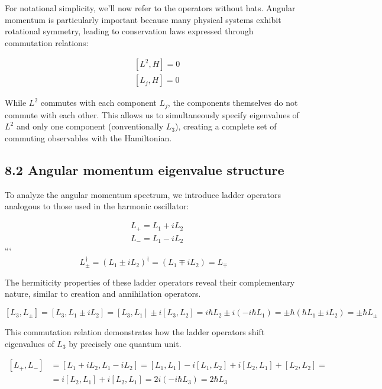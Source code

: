 \documentclass[italian]{HKNdocument}
\begin{document}
For notational simplicity, we'll now refer to the operators without hats. Angular momentum is particularly important because many physical systems exhibit rotational symmetry, leading to conservation laws expressed through commutation relations:

\begin{align*}
& {\left[L^{2}, H\right]=0} \\
& {\left[L_{j}, H\right]=0} \tag{8.7}
\end{align*}

While $L^2$ commutes with each component $L_j$, the components themselves do not commute with each other. This allows us to simultaneously specify eigenvalues of $L^2$ and only one component (conventionally $L_3$), creating a complete set of commuting observables with the Hamiltonian.

\subsection*{8.2 Angular momentum eigenvalue structure}
To analyze the angular momentum spectrum, we introduce ladder operators analogous to those used in the harmonic oscillator:

\begin{align*}
& L_{+}=L_{1}+i L_{2} \\
& L_{-}=L_{1}-i L_{2} \tag{8.8}
\end{align*}
```
\begin{equation*}
L_{ \pm}^{\dagger}=\left(L_{1} \pm i L_{2}\right)^{\dagger}=\left(L_{1} \mp i L_{2}\right)=L_{\mp} \tag{8.9}
\end{equation*}

The hermiticity properties of these ladder operators reveal their complementary nature, similar to creation and annihilation operators.

\begin{equation*}
\left[L_{3}, L_{ \pm}\right]=\left[L_{3}, L_{1} \pm i L_{2}\right]=\left[L_{3}, L_{1}\right] \pm i\left[L_{3}, L_{2}\right]=i \hbar L_{2} \pm i\left(-i \hbar L_{1}\right)= \pm \hbar\left(\hbar L_{1} \pm i L_{2}\right)= \pm \hbar L_{ \pm} \tag{8.10}
\end{equation*}

This commutation relation demonstrates how the ladder operators shift eigenvalues of $L_3$ by precisely one quantum unit.

\begin{align*}
{\left[L_{+}, L_{-}\right] } & =\left[L_{1}+i L_{2}, L_{1}-i L_{2}\right]=\left[L_{1}, L_{1}\right]-i\left[L_{1}, L_{2}\right]+i\left[L_{2}, L_{1}\right]+\left[L_{2}, L_{2}\right]= \\
& =i\left[L_{2}, L_{1}\right]+i\left[L_{2}, L_{1}\right]=2 i\left(-i \hbar L_{3}\right)=2 \hbar L_{3} \tag{8.11}
\end{align*}
\end{document}
